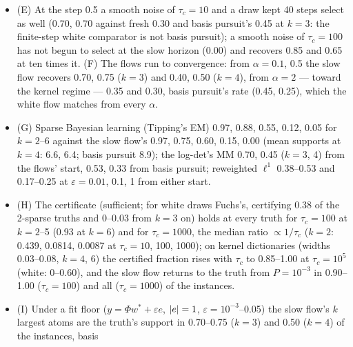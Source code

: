 \begin{itemize}
    1.00 against 0.85 (width 0.05, $k = 4$), 0.78 against 0.65 ($k = 6$), the white flow at basis pursuit's rate;
    label-noise descent with AR(1) draws recovers the truth on two of three instances where basis pursuit fails (all 16
    paths, errors $2\cdot10^{-13}$--$7\cdot10^{-8}$); on the third it is still on 12--13 atoms at the end, its reduced
    flow then at $8.8\cdot10^{-3}$ and reaching the truth when run on ($3\cdot10^{-13}$ at $s = 1600$); fresh draws end
    within 0.08--0.11 of basis pursuit's solution.
  \item (E) At the step 0.5 a smooth noise of $\tau_c = 10$ and a draw kept 40 steps select as well (0.70, 0.70 against
    fresh 0.30 and basis pursuit's 0.45 at $k = 3$: the finite-step white comparator is not basis pursuit); a smooth noise
    of $\tau_c = 100$ has not begun to select at the slow horizon (0.00) and recovers 0.85 and 0.65 at ten times it. (F)
    The flows run to convergence: from $\alpha = 0.1$, 0.5 the slow flow recovers 0.70, 0.75 ($k = 3$) and 0.40, 0.50
    ($k = 4$), from $\alpha = 2$ --- toward the kernel regime --- 0.35 and 0.30, basis pursuit's rate (0.45, 0.25), which
    the white flow matches from every $\alpha$.
  \item (G) Sparse Bayesian learning (Tipping's EM) 0.97, 0.88, 0.55, 0.12, 0.05 for $k = 2$--6 against the slow flow's
    0.97, 0.75, 0.60, 0.15, 0.00 (mean supports at $k = 4$: 6.6, 6.4; basis pursuit 8.9); the log-det's MM 0.70, 0.45
    ($k = 3$, 4) from the flows' start, 0.53, 0.33 from basis pursuit; reweighted $\ell^1$ 0.38--0.53 and 0.17--0.25 at
    $\varepsilon = 0.01$, 0.1, 1 from either start.
  \item (H) The certificate (sufficient; for white draws Fuchs's, certifying 0.38 of the 2-sparse truths and 0--0.03
    from $k = 3$ on) holds at every truth for $\tau_c = 100$ at $k = 2$--5 (0.93 at $k = 6$) and for $\tau_c = 1000$,
    the median ratio $\propto1/\tau_c$ ($k = 2$: 0.439, 0.0814, 0.0087 at $\tau_c = 10$, 100, 1000); on kernel
    dictionaries (widths 0.03--0.08, $k = 4$, 6) the certified fraction rises with $\tau_c$ to 0.85--1.00 at
    $\tau_c = 10^5$ (white: 0--0.60), and the slow flow returns to the truth from $P = 10^{-3}$ in 0.90--1.00
    ($\tau_c = 100$) and all ($\tau_c = 1000$) of the instances.
  \item (I) Under a fit floor ($y = \Phi w^* + \varepsilon e$, $\lvert e\rvert = 1$, $\varepsilon = 10^{-3}$--0.05) the slow
    flow's $k$ largest atoms are the truth's support in 0.70--0.75 ($k = 3$) and 0.50 ($k = 4$) of the instances, basis

\end{itemize}
